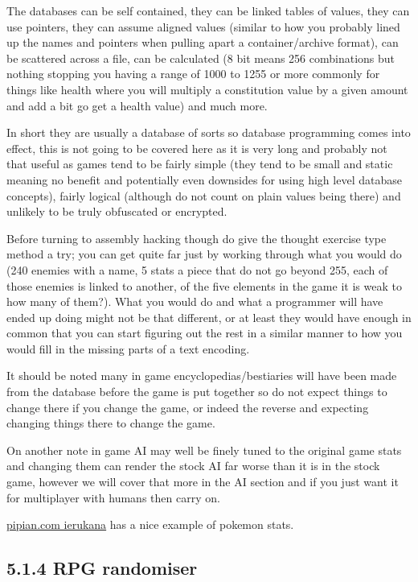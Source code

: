 \documentclass[
]{book}
\begin{document}
The databases can be self contained, they can be linked tables of values, they can use pointers, they can assume aligned values (similar to how you probably lined up the names and pointers when pulling apart a container/archive format), can be scattered across a file, can be calculated (8 bit means 256 combinations but nothing stopping you having a range of 1000 to 1255 or more commonly for things like health where you will multiply a constitution value by a given amount and add a bit go get a health value) and much more.

In short they are usually a database of sorts so database programming comes into effect, this is not going to be covered here as it is very long and probably not that useful as games tend to be fairly simple (they tend to be small and static meaning no benefit and potentially even downsides for using high level database concepts), fairly logical (although do not count on plain values being there) and unlikely to be truly obfuscated or encrypted.

Before turning to assembly hacking though do give the thought exercise type method a try; you can get quite far just by working through what you would do (240 enemies with a name, 5 stats a piece that do not go beyond 255, each of those enemies is linked to another, of the five elements in the game it is weak to how many of them?). What you would do and what a programmer will have ended up doing might not be that different, or at least they would have enough in common that you can start figuring out the rest in a similar manner to how you would fill in the missing parts of a text encoding.

It should be noted many in game encyclopedias/bestiaries will have been made from the database before the game is put together so do not expect things to change there if you change the game, or indeed the reverse and expecting changing things there to change the game.

On another note in game AI may well be finely tuned to the original game stats and changing them can render the stock AI far worse than it is in the stock game, however we will cover that more in the AI section and if you just want it for multiplayer with humans then carry on.

\href{http://www.pipian.com/ierukana/hacking/ds_evos.html}{pipian.com ierukana} has a nice example of pokemon stats.

\hypertarget{rpg-randomiser}{%
\subsection{5.1.4 RPG randomiser}\label{rpg-randomiser}}
\end{document}

